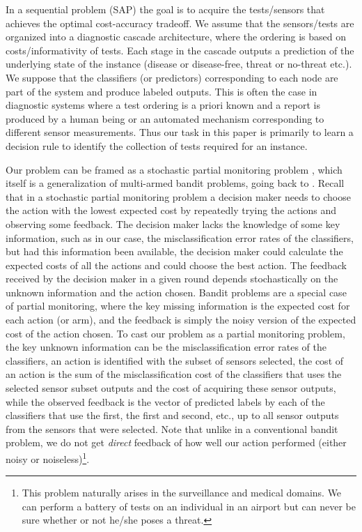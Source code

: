 In a sequential \ses problem (SAP) 
 the goal is to acquire the tests/sensors that achieves the optimal cost-accuracy tradeoff.
 We assume that the sensors/tests are organized into a diagnostic cascade architecture, where the ordering is based on costs/informativity of tests. Each stage in the cascade outputs a prediction of the underlying state of the instance (disease or disease-free, threat or no-threat etc.). We suppose that the classifiers (or predictors) corresponding to each node are part of the system and produce labeled outputs. This is often the case in diagnostic systems where a test ordering is a priori known and a report is produced by a human being or an automated mechanism corresponding to different sensor measurements. Thus our task in this paper is primarily to learn a decision rule to identify the collection of tests required for an instance. 
\fi

Our problem can be framed as a stochastic partial monitoring problem \citep{BaFoPaRaSze14},
which itself is a generalization of multi-armed bandit problems, going back to \citet{Tho33}. 
Recall that in a stochastic partial monitoring problem a decision maker needs to choose the action with the lowest 
expected cost by repeatedly trying the actions and observing some feedback.
The decision maker lacks the knowledge of some key information, such as in our case, the misclassification
error rates of the classifiers, but had this information been available, the decision maker could calculate the
expected costs of all the actions and could choose the best action. The feedback received by the decision
maker in a given round depends stochastically on the unknown information and the action chosen.
Bandit problems are a special case of partial monitoring, where the key missing information is the expected
cost for each action (or arm), and the feedback is simply the noisy version of the expected cost of the action chosen.
To cast our problem as a partial monitoring problem, 
the key unknown information can be the misclassification error rates of the classifiers, an action is identified with 
the subset of sensors selected, the cost of an action is the sum of the misclassification cost of the classifiers
that uses the selected sensor subset outputs and the cost of acquiring these sensor outputs,
while the observed feedback is the vector of predicted labels by each of the classifiers that use 
the first, the first and second, etc., up to all sensor outputs from the sensors that were selected.
Note that unlike in a conventional bandit problem, we do not get \emph{direct} 
feedback of how well our action performed (either noisy or noiseless)\footnote{This problem naturally arises in the surveillance and medical domains. We can perform a battery of tests on an individual in an airport but can never be sure whether or not he/she poses a threat.}.

